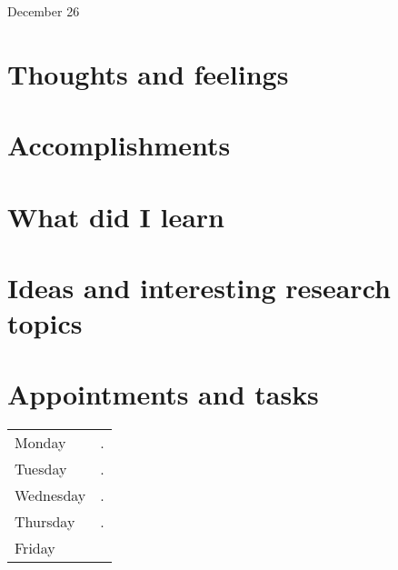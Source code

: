 \documentclass[11pt,letterpaper]{article}
\begin{document}
{\Huge December 26}

\section*{Thoughts and feelings}
\section*{Accomplishments}
\section*{What did I learn}
\section*{Ideas and interesting research topics}
\section*{Appointments and tasks}
	\begin{center}                                                          
	\begin{tabular}{l|p{}} %
	Monday & . \\                                                 
	Tuesday & .\\                                                        
	Wednesday & .\\                                       
	Thursday & . \\       	
	Friday
	\end{tabular}                                                           
        \end{center}      
\end{document}
